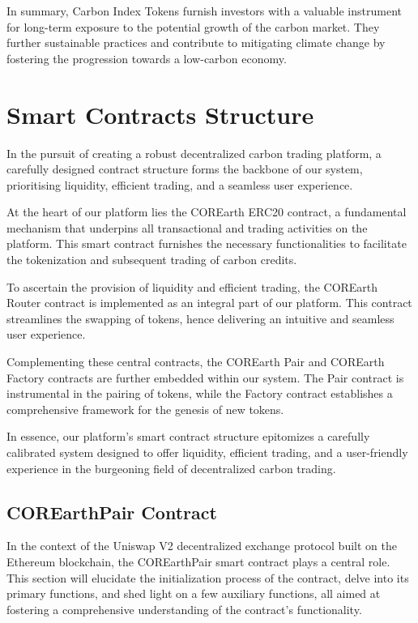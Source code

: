 \documentclass[sigconf, authordraft]{acmart}
\begin{document}
	In summary, Carbon Index Tokens furnish investors with a valuable instrument
	for long-term exposure to the potential growth of the carbon market. They further
	sustainable practices and contribute to mitigating climate change by fostering
	the progression towards a low-carbon economy.

	\section{Smart Contracts Structure }


	In the pursuit of creating a robust decentralized carbon trading platform, a
	carefully designed contract structure forms the backbone of our system, prioritising
	liquidity, efficient trading, and a seamless user experience.

	At the heart of our platform lies the COREarth ERC20 contract, a fundamental
	mechanism that underpins all transactional and trading activities on the
	platform. This smart contract furnishes the necessary functionalities to facilitate
	the tokenization and subsequent trading of carbon credits.

	To ascertain the provision of liquidity and efficient trading, the COREarth
	Router contract is implemented as an integral part of our platform. This contract
	streamlines the swapping of tokens, hence delivering an intuitive and seamless
	user experience.

	Complementing these central contracts, the COREarth Pair and COREarth Factory contracts
	are further embedded within our system. The Pair contract is instrumental in
	the pairing of tokens, while the Factory contract establishes a comprehensive framework
	for the genesis of new tokens.

	In essence, our platform's smart contract structure epitomizes a carefully
	calibrated system designed to offer liquidity, efficient trading, and a user-friendly
	experience in the burgeoning field of decentralized carbon trading.

	\subsection{COREarthPair Contract}


	In the context of the Uniswap V2 decentralized exchange protocol built on the
	Ethereum blockchain, the COREarthPair smart contract plays a central role.
	This section will elucidate the initialization process of the contract, delve into
	its primary functions, and shed light on a few auxiliary functions, all aimed at
	fostering a comprehensive understanding of the contract's functionality.
\end{document}
